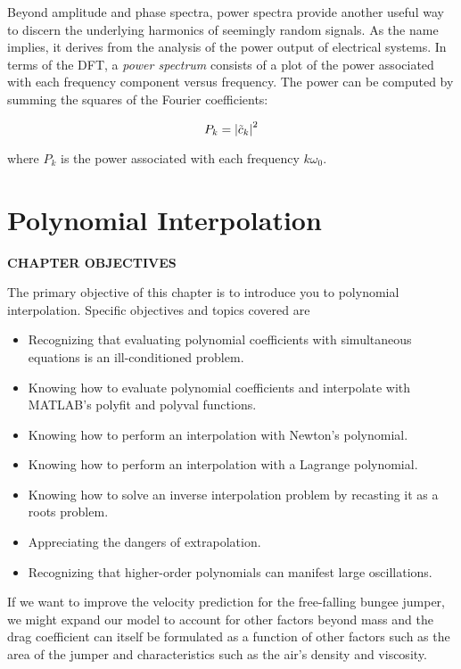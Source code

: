 \documentclass[../main.tex]{subfiles}
\begin{document}
\noindent Beyond amplitude and phase spectra, power spectra provide another useful way to discern
the underlying harmonics of seemingly random signals. As the name implies, it derives
from the analysis of the power output of electrical systems. In terms of the DFT, a \textit{power
spectrum} consists of a plot of the power associated with each frequency component versus
frequency. The power can be computed by summing the squares of the Fourier coefficients:

\begin{equation}
	\notag
	P_k = {|\tilde{c}_k|}^2
\end{equation}

\noindent where $P_k$ is the power associated with each frequency $k \omega_0$.




\label{cha:cha_P_17} %
\chapter{Polynomial Interpolation}
\textbf{CHAPTER OBJECTIVES}

\noindent The primary objective of this chapter is to introduce you to polynomial interpolation.
Specific objectives and topics covered are

\begin{itemize}
	\item Recognizing that evaluating polynomial coefficients with simultaneous equations is an ill-conditioned problem.
	\item  Knowing how to evaluate polynomial coefficients and interpolate with MATLAB's polyfit and polyval functions.
	\item  Knowing how to perform an interpolation with Newton's polynomial.
	\item  Knowing how to perform an interpolation with a Lagrange polynomial.
	\item  Knowing how to solve an inverse interpolation problem by recasting it as a roots problem.
	\item  Appreciating the dangers of extrapolation.
	\item  Recognizing that higher-order polynomials can manifest large oscillations.
\end{itemize}


If we want to improve the velocity prediction for the free-falling bungee jumper, we might expand our model to account for other factors beyond mass and the drag coefficient can itself be formulated as a function of other factors such as the area of the jumper and characteristics such as the air's density and viscosity.
\end{document}
